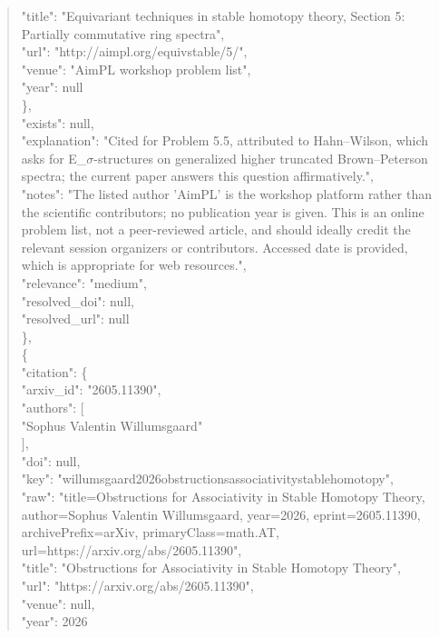 \documentclass[11pt]{article}
\begin{document}
\begin{quote}
        "title": "Equivariant techniques in stable homotopy theory, Section 5: Partially commutative ring spectra",\\
        "url": "http://aimpl.org/equivstable/5/",\\
        "venue": "AimPL workshop problem list",\\
        "year": null\\
      \},\\
      "exists": null,\\
      "explanation": "Cited for Problem 5.5, attributed to Hahn--Wilson, which asks for E\_\ensuremath{\sigma}-structures on generalized higher truncated Brown--Peterson spectra; the current paper answers this question affirmatively.",\\
      "notes": "The listed author 'AimPL' is the workshop platform rather than the scientific contributors; no publication year is given. This is an online problem list, not a peer-reviewed article, and should ideally credit the relevant session organizers or contributors. Accessed date is provided, which is appropriate for web resources.",\\
      "relevance": "medium",\\
      "resolved\_doi": null,\\
      "resolved\_url": null\\
    \},\\
    \{\\
      "citation": \{\\
        "arxiv\_id": "2605.11390",\\
        "authors": [\\
          "Sophus Valentin Willumsgaard"\\
        ],\\
        "doi": null,\\
        "key": "willumsgaard2026obstructionsassociativitystablehomotopy",\\
        "raw": "title=Obstructions for Associativity in Stable Homotopy Theory, author=Sophus Valentin Willumsgaard, year=2026, eprint=2605.11390, archivePrefix=arXiv, primaryClass=math.AT, url=https://arxiv.org/abs/2605.11390",\\
        "title": "Obstructions for Associativity in Stable Homotopy Theory",\\
        "url": "https://arxiv.org/abs/2605.11390",\\
        "venue": null,\\
        "year": 2026\\

\end{quote}
\end{document}
